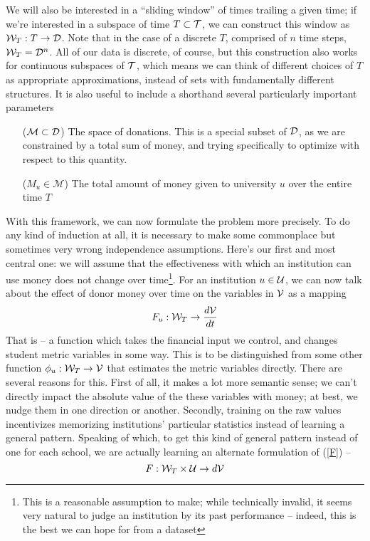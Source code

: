 \documentclass[paper.tex]{subfiles}
\begin{document}
	We will also be interested in a ``sliding window'' of times trailing a given time; if we're interested in a subspace of time $T \subset \mathcal{T}$, we can construct this window as $\mathcal{W}_T : T  \to \mathcal{D}$. Note that in the case of a discrete $T$, comprised of $n$ time steps, $\mathcal{W}_T = \mathcal{D}^n$. All of our data is discrete, of course, but this construction also works for continuous subspaces of $\mathcal{T}$, which means we can think of different choices of $T$ as appropriate approximations, instead of sets with fundamentally different structures. It is also useful to include a shorthand several particularly important parameters
	
	\begin{itemize}[leftmargin=5em]
		\item[($\mathcal{M} \subset \mathcal{D}$)] The space of donations. This is a special subset of $\mathcal{D}$, as we are constrained by a total sum of money, and trying specifically to optimize with respect to this quantity.
		\item[($M_u \in \mathcal{M}$)] The total amount of money given to university $u$ over the entire time $T$
	\end{itemize}
	
	With this framework, we can now formulate the problem more precisely. To do any kind of induction at all, it is necessary to make some commonplace but sometimes very wrong independence assumptions. Here's our first and most central one: we will assume that the effectiveness with which an institution can use money does not change over time\footnote{This is a reasonable assumption to make; while technically invalid, it seems very natural to judge an institution by its past performance -- indeed, this is the best we can hope for from a dataset}. For an institution $u \in \mathcal{U}$, we can now talk about the effect of donor money over time on the variables in $\mathcal{V}$ as a mapping
	\begin{equation}
		F_u: \mathcal{W}_T \to \frac{d\mathcal{V}}{dt} \label{F}
	\end{equation} 	
	That is -- a function which takes the financial input we control, and changes student metric variables in some way. This is to be distinguished from some other function $\phi_u: \mathcal{W}_T \to \mathcal{V}$ that estimates the metric variables directly. There are several reasons for this. First of all, it makes a lot more semantic sense; we can't directly impact the absolute value of the these variables with money; at best, we nudge them in one direction or another. Secondly, training on the raw values incentivizes memorizing institutions' particular statistics instead of learning a general pattern. Speaking of which, to get this kind of general pattern instead of one for each school, we are actually learning an alternate formulation of (\ref{F}) -- 
	\[F: \mathcal{W}_T \times \mathcal{U} \to d\mathcal{V} \]
	
\end{document}
